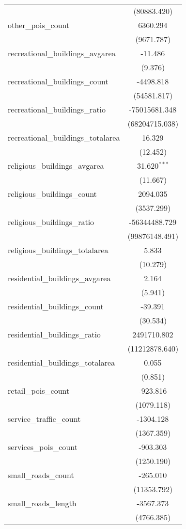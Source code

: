 \begin{table}[!htbp]
\begin{tabular}{@{\extracolsep{5pt}}lc}
  & (80883.420) \\
 other_pois_count & 6360.294$^{}$ \\
  & (9671.787) \\
 recreational_buildings_avgarea & -11.486$^{}$ \\
  & (9.376) \\
 recreational_buildings_count & -4498.818$^{}$ \\
  & (54581.817) \\
 recreational_buildings_ratio & -75015681.348$^{}$ \\
  & (68204715.038) \\
 recreational_buildings_totalarea & 16.329$^{}$ \\
  & (12.452) \\
 religious_buildings_avgarea & 31.620$^{***}$ \\
  & (11.667) \\
 religious_buildings_count & 2094.035$^{}$ \\
  & (3537.299) \\
 religious_buildings_ratio & -56344488.729$^{}$ \\
  & (99876148.491) \\
 religious_buildings_totalarea & 5.833$^{}$ \\
  & (10.279) \\
 residential_buildings_avgarea & 2.164$^{}$ \\
  & (5.941) \\
 residential_buildings_count & -39.391$^{}$ \\
  & (30.534) \\
 residential_buildings_ratio & 2491710.802$^{}$ \\
  & (11212878.640) \\
 residential_buildings_totalarea & 0.055$^{}$ \\
  & (0.851) \\
 retail_pois_count & -923.816$^{}$ \\
  & (1079.118) \\
 service_traffic_count & -1304.128$^{}$ \\
  & (1367.359) \\
 services_pois_count & -903.303$^{}$ \\
  & (1250.190) \\
 small_roads_count & -265.010$^{}$ \\
  & (11353.792) \\
 small_roads_length & -3567.373$^{}$ \\
  & (4766.385) \\

\end{tabular}
\end{table}
